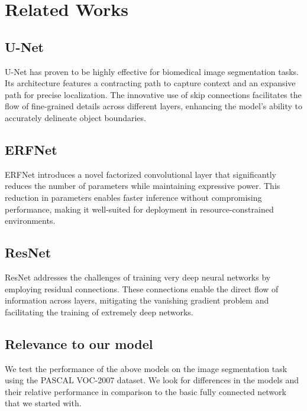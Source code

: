 \section*{Related Works}

\subsection*{U-Net} 
U-Net \cite{unet} has proven to be highly effective for biomedical image segmentation tasks. Its architecture features a contracting path to capture context and an expansive path for precise localization. The innovative use of skip connections facilitates the flow of fine-grained details across different layers, enhancing the model's ability to accurately delineate object boundaries.

\subsection*{ERFNet} 
ERFNet \cite{erfnet} introduces a novel factorized convolutional layer that significantly reduces the number of parameters while maintaining expressive power. This reduction in parameters enables faster inference without compromising performance, making it well-suited for deployment in resource-constrained environments.

\subsection*{ResNet} 
ResNet \cite{resnet} addresses the challenges of training very deep neural networks by employing residual connections. These connections enable the direct flow of information across layers, mitigating the vanishing gradient problem and facilitating the training of extremely deep networks.

\subsection*{Relevance to our model} 
We test the performance of the above models on the image segmentation task using the PASCAL VOC-2007 dataset. We look for differences in the models and their relative performance in comparison to the basic fully connected network that we started with.

